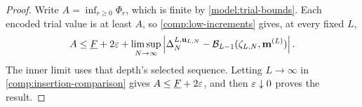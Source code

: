 
\begin{proof}
Write $A=\inf_{r\ge0}\Phi_r$, which is finite by
\eqref{model:trial-bounds}. Each encoded trial value is at least $A$, so
\eqref{comp:low-increments} gives, at every fixed $L$,
\[
 A\le\underline F+2\varepsilon+
 \limsup_{N\to\infty}
 \left|\Delta_N^{L,\mathbf u_{L,N}}
       -\mathcal B_{L-1}(\zeta_{L,N},\mathbf m^{(L)})\right|.
\]
The inner limit uses that depth's selected sequence. Letting $L\to\infty$
in \cref{comp:insertion-comparison} gives
$A\le\underline F+2\varepsilon$, and then $\varepsilon\downarrow0$ proves the result.
\end{proof}
